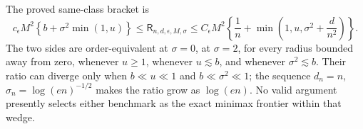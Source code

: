 The proved same-class bracket is
\[
 c_{\epsilon}M^2\left\{b+\sigma^2\min(1,u)\right\}
 \le \mathsf R_{n,d,\epsilon,M,\sigma}
 \le C_{\epsilon}M^2\left\{\frac1n+\min\left(1,u,\sigma^2+\frac d{n^2}\right)\right\}.
\]
The two sides are order-equivalent at \(\sigma=0\), at \(\sigma=2\), for every radius bounded away from zero, whenever \(u\ge1\), whenever \(u\lesssim b\), and whenever \(\sigma^2\lesssim b\).  Their ratio can diverge only when \(b\ll u\ll1\) and \(b\ll\sigma^2\ll1\); the sequence \(d_n=n\), \(\sigma_n=\log(en)^{-1/2}\) makes the ratio grow as \(\log(en)\).  No valid argument presently selects either benchmark as the exact minimax frontier within that wedge.